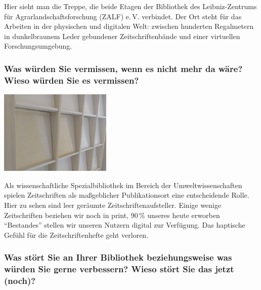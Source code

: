 Hier sieht man die Treppe, die beide Etagen der Bibliothek des
Leibniz-Zentrums für Agrarlandschaftsforschung (ZALF) e.\,V. verbindet.
Der Ort steht für das Arbeiten in der physischen und digitalen Welt:
zwischen hunderten Regalmetern in dunkelbraunem Leder gebundener
Zeitschriftenbände und einer virtuellen Forschungsumgebung.

\hypertarget{was-wuxfcrden-sie-vermissen-wenn-es-nicht-mehr-da-wuxe4re-wieso-wuxfcrden-sie-es-vermissen}{%
\subsubsection*{Was würden Sie vermissen, wenn es nicht mehr da wäre? Wieso
würden Sie es
vermissen?}\label{was-wuxfcrden-sie-vermissen-wenn-es-nicht-mehr-da-wuxe4re-wieso-wuxfcrden-sie-es-vermissen}}

\begin{center}
\includegraphics[width=0.4\textwidth]{zalf/img/leere-zeitschriftenaufsteller.jpg}
\end{center}

Als wissenschaftliche Spezialbibliothek im Bereich der
Umweltwissenschaften spielen Zeitschriften als maßgeblicher
Publikationsort eine entscheidende Rolle. Hier zu sehen sind leer
geräumte Zeitschriftenaufsteller. Einige wenige Zeitschriften beziehen
wir noch in print, 90\,\% unseres heute erworben \enquote{Bestandes}
stellen wir unseren Nutzern digital zur Verfügung. Das haptische Gefühl
für die Zeitschriftenhefte geht verloren.

\hypertarget{was-stuxf6rt-sie-an-ihrer-bibliothek-beziehungsweise-was-wuxfcrden-sie-gerne-verbessern-wieso-stuxf6rt-sie-das-jetzt-noch}{%
\subsubsection*{Was stört Sie an Ihrer Bibliothek beziehungsweise was würden
Sie gerne verbessern? Wieso stört Sie das jetzt
(noch)?}\label{was-stuxf6rt-sie-an-ihrer-bibliothek-beziehungsweise-was-wuxfcrden-sie-gerne-verbessern-wieso-stuxf6rt-sie-das-jetzt-noch}}

